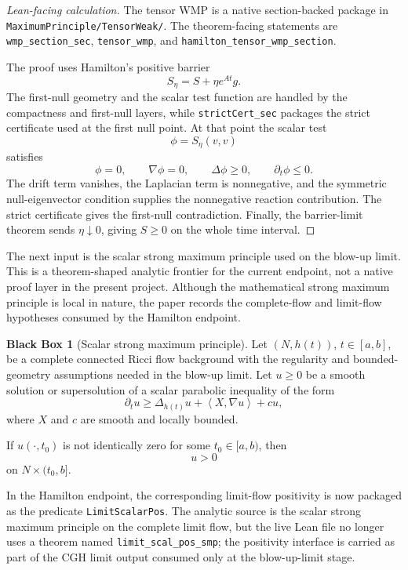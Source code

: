 \documentclass[11pt]{article}
\theoremstyle{plain}
\theoremstyle{definition}
\newtheorem{blackbox}[theorem]{Black Box}
\theoremstyle{remark}
\newcommand{\ip}[2]{\left\langle #1,#2\right\rangle}
\newcommand{\leanref}[1]{\nolinkurl{#1}}
\newcommand{\leanfile}[1]{\nolinkurl{#1}}
\newcommand{\rfdir}[1]{\leanfile{#1/}}
\begin{document}
\begin{proof}[Lean-facing calculation]
The tensor WMP is a native section-backed package in
\rfdir{MaximumPrinciple/TensorWeak}.  The theorem-facing statements are
\leanref{wmp_section_sec}, \leanref{tensor_wmp}, and
\leanref{hamilton_tensor_wmp_section}.

The proof uses Hamilton's positive barrier
\[
  S_\eta=S+\eta e^{At}g.
\]
The first-null geometry and the scalar test function are handled by the
compactness and first-null layers, while \leanref{strictCert_sec} packages the
strict certificate used at the first null point.  At that point the scalar test
\[
  \phi=S_\eta(v,v)
\]
satisfies
\[
  \phi=0,
  \qquad
  \nabla\phi=0,
  \qquad
  \Delta\phi\ge0,
  \qquad
  \partial_t\phi\le0.
\]
The drift term vanishes, the Laplacian term is nonnegative, and the symmetric
null-eigenvector condition supplies the nonnegative reaction contribution.  The
strict certificate gives the first-null contradiction.  Finally, the
barrier-limit theorem sends $\eta\downarrow0$, giving $S\ge0$ on the whole time
interval.
\end{proof}

The next input is the scalar strong maximum principle used on the blow-up
limit.  This is a theorem-shaped analytic frontier for the current endpoint,
not a native proof layer in the present project.  Although the mathematical
strong maximum principle is local in nature, the paper records the
complete-flow and limit-flow hypotheses consumed by the Hamilton endpoint.

\begin{blackbox}[Scalar strong maximum principle]
\label{bb:scalar-strong-mp}
Let $(N,h(t))$, $t\in[a,b]$, be a complete connected Ricci flow background
with the regularity and bounded-geometry assumptions needed in the blow-up
limit. Let $u\ge0$ be a smooth solution or supersolution of a scalar parabolic
inequality of the form
\[
\partial_tu\ge \Delta_{h(t)}u+\ip{X}{\nabla u}+cu,
\]
where $X$ and $c$ are smooth and locally bounded.

If $u(\cdot,t_0)$ is not identically zero for some $t_0\in[a,b)$, then
\[
u>0
\]
on $N\times(t_0,b]$.
\end{blackbox}

In the Hamilton endpoint, the corresponding limit-flow positivity is now
packaged as the predicate \leanref{LimitScalarPos}.  The analytic source is the
scalar strong maximum principle on the complete limit flow, but the live Lean
file no longer uses a theorem named \texttt{limit\_scal\_pos\_smp}; the positivity
interface is carried as part of the CGH limit output consumed only at the
blow-up-limit stage.
\end{document}
